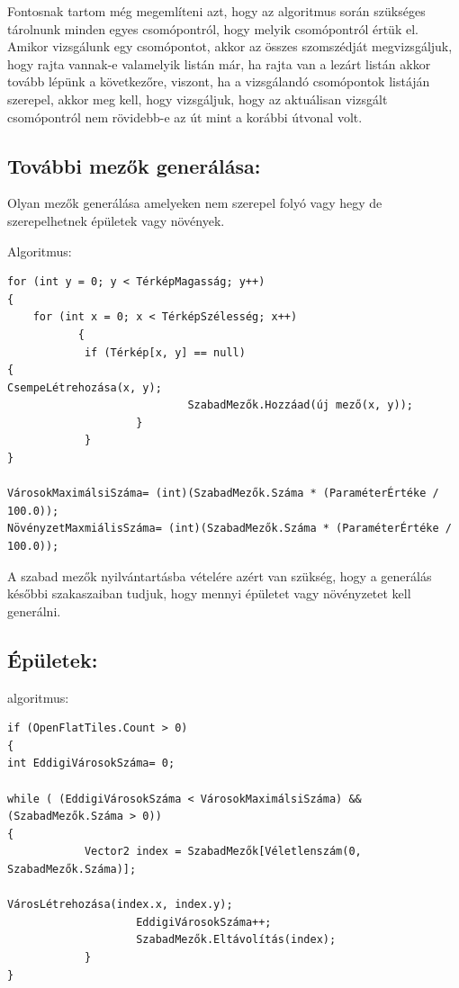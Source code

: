 Fontosnak tartom még megemlíteni azt, hogy az algoritmus során szükséges tárolnunk minden egyes csomópontról, hogy melyik csomópontról értük el. Amikor vizsgálunk egy csomópontot, akkor az összes szomszédját megvizsgáljuk, hogy rajta vannak-e valamelyik listán már, ha rajta van a lezárt listán akkor tovább lépünk a következőre, viszont, ha a vizsgálandó csomópontok listáján szerepel, akkor meg kell, hogy vizsgáljuk, hogy az aktuálisan vizsgált csomópontról nem rövidebb-e az út mint a korábbi útvonal volt.

\subsection{További mezők generálása:}

Olyan mezők generálása amelyeken nem szerepel folyó vagy hegy de szerepelhetnek épületek vagy növények.

Algoritmus:     

\begin{verbatim}
for (int y = 0; y < TérképMagasság; y++)
{
 	for (int x = 0; x < TérképSzélesség; x++)
           {
           	if (Térkép[x, y] == null)
{
CsempeLétrehozása(x, y);
                    		SzabadMezők.Hozzáad(új mező(x, y));
                	}
            }
}

VárosokMaximálsiSzáma= (int)(SzabadMezők.Száma * (ParaméterÉrtéke / 100.0));
NövényzetMaxmiálisSzáma= (int)(SzabadMezők.Száma * (ParaméterÉrtéke / 100.0));
\end{verbatim}

A szabad mezők nyilvántartásba vételére azért van szükség, hogy a generálás későbbi szakaszaiban tudjuk, hogy mennyi épületet vagy növényzetet kell generálni.

\subsection{Épületek:}

algoritmus:

\begin{verbatim}
if (OpenFlatTiles.Count > 0)
{
int EddigiVárosokSzáma= 0;
    
while ( (EddigiVárosokSzáma < VárosokMaximálsiSzáma) && (SzabadMezők.Száma > 0))
{
           	Vector2 index = SzabadMezők[Véletlenszám(0, SzabadMezők.Száma)];

VárosLétrehozása(index.x, index.y);
                	EddigiVárosokSzáma++;
                	SzabadMezők.Eltávolítás(index);
            }
}
\end{verbatim}

